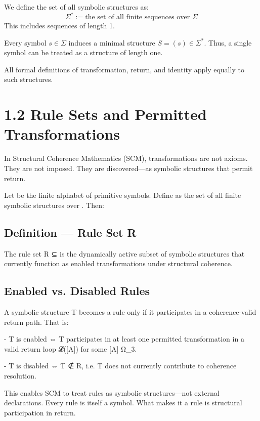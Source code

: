 We define the set of all symbolic structures as:
\begin{equation} \label{eq:auto-03}
\Sigma^* := \text{the set of all finite sequences over } \Sigma
\end{equation}
This includes sequences of length 1.

Every symbol $s \in \Sigma$ induces a minimal structure $S = (s) \in \Sigma^*$.  
Thus, a single symbol can be treated as a structure of length one.

All formal definitions of transformation, return, and identity apply equally to such structures.

\section{1.2 \textbar{} Rule Sets and Permitted
Transformations}\label{rule-sets-and-permitted-transformations}

In Structural Coherence Mathematics (SCM), transformations are not
axioms. They are not imposed. They are discovered---as symbolic
structures that permit return.

Let \Sigma be the finite alphabet of primitive symbols. Define \Sigma* as the set
of all finite symbolic structures over \Sigma. Then:

\subsection{Definition --- Rule Set R}\label{definition-rule-set-r}

The rule set R ⊆ \Sigma* is the dynamically active subset of symbolic
structures that currently function as enabled transformations under
structural coherence.

\subsection{Enabled vs. Disabled
Rules}\label{enabled-vs.-disabled-rules}

A symbolic structure T \in \Sigma* becomes a rule only if it participates in a
coherence-valid return path. That is:

- T is enabled ⇔ T participates in at least one permitted transformation
in a valid return loop 𝓛({[}A{]}) for some {[}A{]} \in Ω_3.

- T is disabled ⇔ T ∉ R, i.e. T does not currently contribute to
coherence resolution.

This enables SCM to treat rules as symbolic structures---not external
declarations. Every rule is itself a symbol. What makes it a rule is
structural participation in return.

